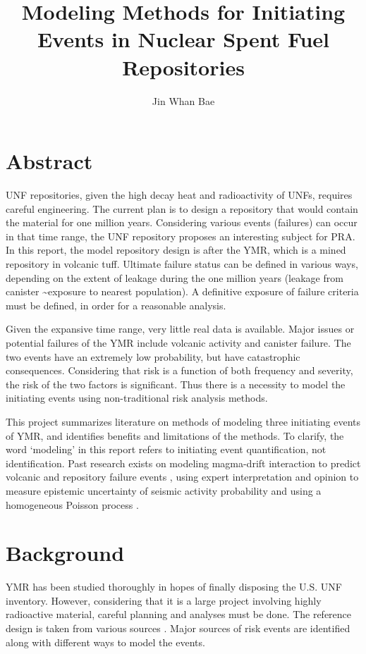 \documentclass[12pt]{article}
\title{Modeling Methods for Initiating Events in Nuclear Spent Fuel Repositories}
\author{Jin Whan Bae}
\affil{Dept. of Nuclear, Plasma, and Radiological Engineering, University of Illinois at Urbana-Champaign
		  Urbana, IL}
\date{}                     %
\begin{document}
\maketitle

\section{Abstract}
\gls{UNF} repositories, given the high decay heat and radioactivity
of \glspl{UNF}, requires careful engineering. The current plan is
to design a repository that would contain the material for one million years.
Considering various events (failures) can occur in that time range,
the \gls{UNF} repository proposes an interesting subject for
\gls{PRA}. In this report, the model repository design is after the 
\gls{YMR}, which is a mined repository in volcanic tuff.
Ultimate failure status can be defined in various ways, depending on the
extent of leakage during the one million years (leakage from canister
\textasciitilde exposure to nearest population).
A definitive exposure of failure criteria must be defined,
in order for a reasonable analysis.  

Given the expansive
time range, very little real data is available.
Major issues or potential failures of the \gls{YMR} include volcanic activity
and canister failure. The two events have an extremely low
probability, but have catastrophic consequences. Considering that
risk is a function of both frequency and severity, the risk 
of the two factors is significant. Thus there is a necessity
to model the initiating events using non-traditional
risk analysis methods.

This project summarizes literature on methods of modeling
three initiating events of \gls{YMR}, and identifies
benefits and limitations of the methods. To clarify,
the word `modeling' in this report refers to initiating event
quantification, not identification.
Past research exists on 
modeling magma-drift interaction to predict volcanic and repository
failure events \cite{woods_modeling_2002},
using expert interpretation and opinion to measure epistemic
uncertainty of seismic activity probability \cite{stepp_probabilistic_2001}
and using a homogeneous Poisson process \cite{ho_risk_1992}.


\section{Background}
\gls{YMR} has been studied thoroughly in hopes of finally
disposing the U.S. \gls{UNF} inventory. However, considering
that it is a large project involving highly radioactive material,
careful planning and analyses must be done. The reference design
is taken from various sources \cite{u.s._department_of_energy_office_of_civilian_radioactive_waste_management_national_2008, wilson_total-system_1994, rechard_evolution_2014, u.s._department_of_energy_yucca_2002}.
Major sources of risk events are identified along with different ways to model
the events. 
\end{document}
